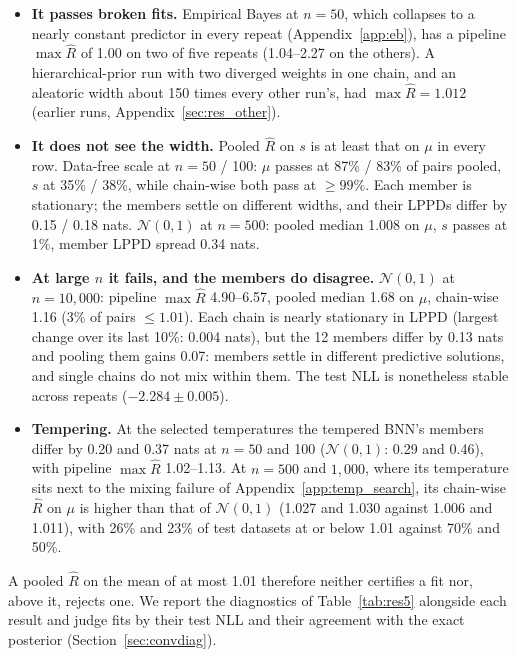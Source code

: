 \documentclass[11pt]{article}
\newcommand{\nzo}{\mathcal{N}(0,1)}
\begin{document}
\begin{itemize}
\item \textbf{It passes broken fits.} Empirical Bayes at $n=50$, which collapses to a nearly constant predictor in
  every repeat (Appendix~\ref{app:eb}), has a pipeline $\max\widehat R$ of 1.00 on two of five repeats (1.04--2.27 on
  the others). A hierarchical-prior run with two diverged weights in one chain, and an aleatoric width about 150 times
  every other run's, had $\max\widehat R=1.012$ (earlier runs, Appendix~\ref{sec:res_other}).
\item \textbf{It does not see the width.} Pooled $\widehat R$ on $s$ is at least that on $\mu$ in every row. Data-free
  scale at $n=50$ / 100: $\mu$ passes at 87\% / 83\% of pairs pooled, $s$ at 35\% / 38\%, while chain-wise both pass at
  $\ge99\%$. Each member is stationary; the members settle on different widths, and their LPPDs differ by 0.15 / 0.18
  nats. $\nzo$ at $n=500$: pooled median 1.008 on $\mu$, $s$ passes at 1\%, member LPPD spread 0.34 nats.
\item \textbf{At large $n$ it fails, and the members do disagree.} $\nzo$ at $n=10{,}000$: pipeline $\max\widehat R$
  4.90--6.57, pooled median 1.68 on $\mu$, chain-wise 1.16 (3\% of pairs $\le1.01$). Each chain is nearly stationary in
  LPPD (largest change over its last 10\%: 0.004 nats), but the 12 members differ by 0.13 nats and pooling them gains
  0.07: members settle in different predictive solutions, and single chains do not mix within them. The test NLL is nonetheless stable across repeats ($-2.284\pm0.005$).
\item \textbf{Tempering.} At the selected temperatures the tempered BNN's members differ by 0.20 and 0.37 nats at
  $n=50$ and 100 ($\nzo$: 0.29 and 0.46), with pipeline $\max\widehat R$ 1.02--1.13. At $n=500$ and $1{,}000$, where its
  temperature sits next to the mixing failure of Appendix~\ref{app:temp_search}, its chain-wise $\widehat R$ on $\mu$ is
  higher than that of $\nzo$ (1.027 and 1.030 against 1.006 and 1.011), with 26\% and 23\% of test datasets at or below
  1.01 against 70\% and 50\%.
\end{itemize}
A pooled $\widehat R$ on the mean of at most 1.01 therefore neither certifies a fit nor, above it, rejects one. We
report the diagnostics of Table~\ref{tab:res5} alongside each result and judge fits by their test NLL and their
agreement with the exact posterior (Section~\ref{sec:convdiag}).
\end{document}
